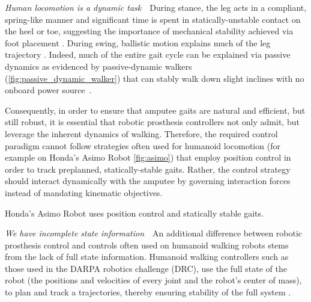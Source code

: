 \begin{challenges}
    \item\label{chal:dynamic} \emph{Human locomotion is a dynamic task}~~During
    stance, the leg acts in a compliant, spring-like manner
    \citep{geyer2006compliant} and significant time is spent in
    statically-unstable contact on the heel or toe, suggesting the importance of
    mechanical stability achieved via foot placement \citep{perry2010gait}.
    During swing, ballistic motion explains much of the leg trajectory
    \citep{mochon1980ballistic}. Indeed, much of the entire gait cycle can be
    explained via passive dynamics as evidenced by passive-dynamic walkers
    (\cref{fig:passive_dynamic_walker}) that can stably walk down slight
    inclines with no onboard power source~\citep{mcgeer1990passive,
    collins2005efficient}.

    Consequently, in order to ensure that amputee gaits are natural and
    efficient, but still robust, it is essential that robotic prosthesis
    controllers not only admit, but leverage the inherent dynamics of walking.
    Therefore, the required control paradigm cannot follow strategies often used
    for humanoid locomotion (for example on Honda's Asimo Robot
    \cref{fig:asimo}) that employ position control in order to track preplanned,
    statically-stable gaits. Rather, the control strategy should interact
    dynamically with the amputee by governing interaction forces instead of
    mandating kinematic objectives.

    \begin{marginfigure}
        \centering
        \caption{Honda's Asimo Robot uses position control and statically
        stable gaits.}
        \label{fig:asimo}
    \end{marginfigure}

    \item\label{chal:incomplete_state} \emph{We have incomplete state
    information}~~An additional difference between robotic prosthesis control
    and controls often used on humanoid walking robots stems from the lack of
    full state information.  Humanoid walking controllers such as those used in
    the DARPA robotics challenge (DRC), use the full state of the robot (\ie the
    positions and velocities of every joint and the robot's center of mass), to
    plan and track a trajectories, thereby ensuring stability of the full system
    \citep{feng2015optimization, kuindersma2014efficiently,
    englsberger2014trajectory}.


\end{challenges}
